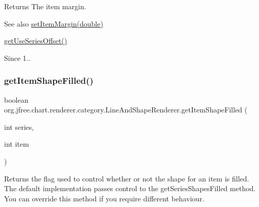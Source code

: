 \begin{DoxyReturn}{Returns}
The item margin.
\end{DoxyReturn}
\begin{DoxySeeAlso}{See also}
\mbox{\hyperlink{classorg_1_1jfree_1_1chart_1_1renderer_1_1category_1_1_line_and_shape_renderer_ae4b9ba27e8ceaab0ba92c76e04d77d95}{set\+Item\+Margin(double)}} 

\mbox{\hyperlink{classorg_1_1jfree_1_1chart_1_1renderer_1_1category_1_1_line_and_shape_renderer_a5966e51f1ff8a604e9ec08c9700ed5ad}{get\+Use\+Series\+Offset()}}
\end{DoxySeeAlso}
\begin{DoxySince}{Since}
1.. 
\end{DoxySince}
\mbox{\label{classorg_1_1jfree_1_1chart_1_1renderer_1_1category_1_1_line_and_shape_renderer_ac1f2bcfb33d3fd24ebdee945abc7a913}} 
\subsubsection{\texorpdfstring{get\+Item\+Shape\+Filled()}{getItemShapeFilled()}}
{\footnotesize\ttfamily boolean org.\+jfree.\+chart.\+renderer.\+category.\+Line\+And\+Shape\+Renderer.\+get\+Item\+Shape\+Filled (\begin{DoxyParamCaption}\item[{int}]{series,  }\item[{int}]{item }\end{DoxyParamCaption})}

Returns the flag used to control whether or not the shape for an item is filled. The default implementation passes control to the {\ttfamily get\+Series\+Shapes\+Filled} method. You can override this method if you require different behaviour.


